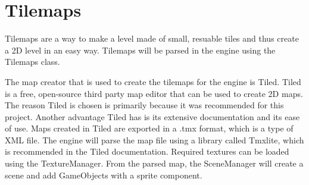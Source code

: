 \section{Tilemaps}
\label{sec:tilemaps}
Tilemaps are a way to make a level made of small, resuable tiles and thus create a 2D level in an easy way.
Tilemaps will be parsed in the engine using the Tilemaps class.

The map creator that is used to create the tilemaps for the engine is Tiled.
Tiled is a free, open-source third party map editor that can be used to create 2D maps.
The reason Tiled is chosen is primarily because it was recommended for this project.
Another advantage Tiled has is its extensive documentation and its ease of use.
Maps created in Tiled are exported in a .tmx format, which is a type of XML file.
The engine will parse the map file using a library called Tmxlite, which is recommended in the Tiled documentation.
Required textures can be loaded using the TextureManager.
From the parsed map, the SceneManager will create a scene and add GameObjects with a sprite component.